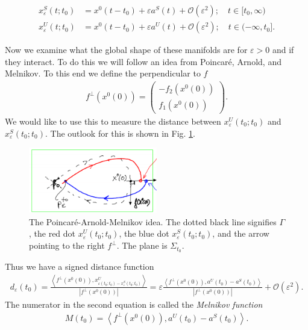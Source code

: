 \begin{align}
	x_{\varepsilon}^{S}(t;t_0) &= x^{0}(t-t_0) + \varepsilon a^{S}(t) + \mathcal{O}(\varepsilon^{2} );\quad t\in [t_0,\infty ) \\
	x_{\varepsilon}^{U}(t;t_0) &= x^{0}(t-t_0) + \varepsilon a^{U}(t) + \mathcal{O}(\varepsilon^{2} );\quad t\in (-\infty, t_0].
\end{align}

Now we examine what the global shape of these manifolds are for $\varepsilon>0$ and if they interact. To do this we will follow an idea from Poincaré, Arnold, and Melnikov. To this end we define the perpendicular to $f$ 
\begin{align}
	f^{\perp}(x^{0}(0)) = 
	\begin{pmatrix}
		-f_2(x^{0}(0)) \\ f_1 (x^{0}(0))
	\end{pmatrix}
	.
\end{align}
We would like to use this to measure the distance between $x^{U}_{\varepsilon}(t_0;t_0)$ and $x^{S}_{\varepsilon}(t_0;t_0)$. The outlook for this is shown in Fig. \ref{fig:PAM_idea}.
\begin{figure}[h!]
	\centering
	\includegraphics[width=0.5\textwidth]{figures/ch6/10PAM_idea.png}
	\caption{The Poincaré-Arnold-Melnikov idea. The dotted black line signifies $\Gamma$, the red dot $x^{U}_{\varepsilon}(t_0;t_0)$, the blue dot $x^{S}_{\varepsilon}(t_0;t_0)$, and the arrow pointing to the right $f^{\perp}$. The plane is $\Sigma_{t_0}$.}
	\label{fig:PAM_idea}
\end{figure}
Thus we have a signed distance function
\begin{align}
	d_{\varepsilon}(t_0) = \frac{\left\langle f^{\perp}(x^{0}(0)), x^{U}_{\varepsilon(t_0; t_0) - x^{S}_{\varepsilon}(t_0; t_0)}\right\rangle}{\left| f^{\perp}(x^{0}(0))\right|} 
	= \varepsilon  \frac{\left\langle f^{\perp}(x^{0}(0)), a^{U}(t_0) - a^{S}(t_0) \right\rangle}{\left| f^{\perp}(x^{0}(0))\right|} + \mathcal{O}(\varepsilon^2).
\end{align}
The numerator in the second equation is called the \emph{Melnikov function}
\begin{align}
	M(t_0)=\left\langle f^{\perp}(x^{0}(0)), a^{U}(t_0) - a^{S}(t_0) \right\rangle	.
\end{align}
